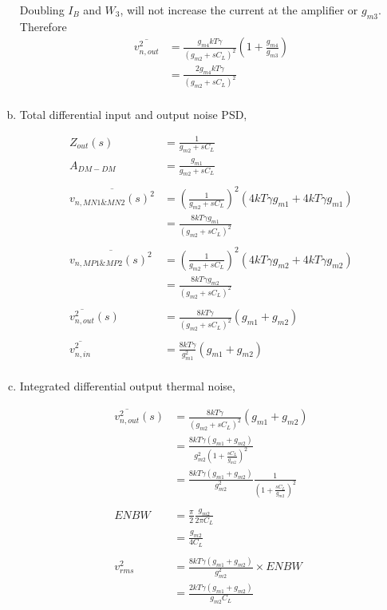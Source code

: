 \documentclass{article}
\begin{document}
\begin{enumerate}[(a)]
Doubling \(I_{B}\) and \(W_{3}\), will not increase the current at the amplifier or \(g_{m3}\).
Therefore
\begin{equation*}
\begin{aligned}
\overline{v_{n, out}^{2}} &= \frac{g_{m4}kT\gamma{}}{(g_{m2} + sC_{L})^{2}}(1 + \frac{g_{m4}}{g_{m3}}) \\
&= \frac{2g_{m4}kT\gamma{}}{(g_{m2} + sC_{L})^{2}} \\
\end{aligned}
\end{equation*}

\item Total differential input and output noise PSD,

\begin{equation*}
\begin{aligned}
Z_{out}(s) &= \frac{1}{g_{m2} + sC_{L}} \\
A_{DM-DM} &= \frac{g_{m1}}{g_{m2} + sC_{L}} \\
\\
\overline{v_{n, MN1 \& MN2}(s)^{2}} &= (\frac{1}{g_{m2} + sC_{L}})^{2}(4kT\gamma{}g_{m1} + 4kT\gamma{}g_{m1}) \\
&= \frac{8kT\gamma{}g_{m1}}{(g_{m2} + sC_{L})^{2}} \\
\\
\overline{v_{n, MP1 \& MP2}(s)^{2}} &= (\frac{1}{g_{m2} + sC_{L}})^{2}(4kT\gamma{}g_{m2} + 4kT\gamma{}g_{m2}) \\
&= \frac{8kT\gamma{}g_{m2}}{(g_{m2} + sC_{L})^{2}} \\
\\
\overline{v_{n,out}^{2}}(s) &= \frac{8kT\gamma{}}{(g_{m2} +sC_{L})^{2}}(g_{m1} + g_{m2}) \\
\\
\overline{v_{n,in}^{2}} &= \frac{8kT\gamma{}}{g_{m1}^{2}}(g_{m1} + g_{m2}) \\
\end{aligned}
\end{equation*}

\item Integrated differential output thermal noise,

\begin{equation*}
\begin{aligned}
\overline{v_{n,out}^{2}}(s) &= \frac{8kT\gamma{}}{(g_{m2} +sC_{L})^{2}}(g_{m1} + g_{m2}) \\
&= \frac{8kT\gamma{}(g_{m1} + g_{m2})}{g_{m2}^{2}(1 +\frac{sC_{L}}{g_{m2}})^{2}} \\
&= \frac{8kT\gamma{}(g_{m1} + g_{m2})}{g_{m2}^{2}} \frac{1}{(1 +\frac{sC_{L}}{g_{m2}})^{2}} \\
\\
ENBW &= \frac{\pi}{2}\frac{g_{m2}}{2\pi{}C_{L}} \\
&= \frac{g_{m2}}{4C_{L}} \\
\\
v_{rms}^2 &= \frac{8kT\gamma{}(g_{m1} + g_{m2})}{g_{m2}^{2}} \times ENBW \\
&= \frac{2kT\gamma{}(g_{m1} + g_{m2})}{g_{m2}C_{L}} \\
\end{aligned}
\end{equation*}


\end{enumerate}
\end{document}
